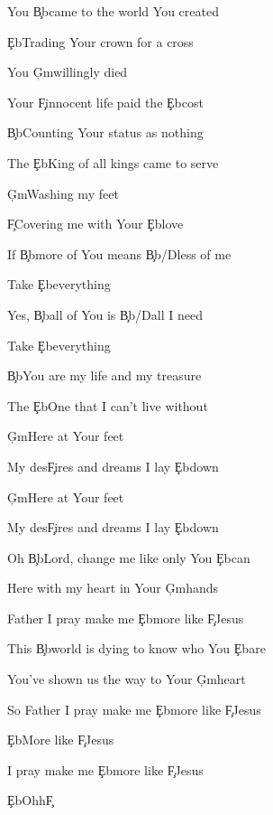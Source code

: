 \documentclass[9pt]{extarticle}
\begin{document}
\bsong

\bi

\ei

\bv
You \c{Bb}came to the world You created

\c{Eb}Trading Your crown for a cross

You \c{Gm}willingly died

Your \c{F}innocent life paid the \c{Eb}cost
\ev

\bv
\c{Bb}Counting Your status as nothing

The \c{Eb}King of all kings came to serve

\c{Gm}Washing my feet

\c{F}Covering me with Your \c{Eb}love
\ev

\bc
If \c{Bb}more of You means \c{Bb/D}less of me

Take \c{Eb}everything

Yes, \c{Bb}all of You is \c{Bb/D}all I need

Take \c{Eb}everything
\ec

\bv
\c{Bb}You are my life and my treasure

The \c{Eb}One that I can't live without

\c{Gm}Here at Your feet

My des\c{F}ires and dreams I lay \c{Eb}down

\c{Gm}Here at Your feet

My des\c{F}ires and dreams I lay \c{Eb}down
\ev


\bb[2]
Oh \c{Bb}Lord, change me like only You \c{Eb}can

Here with my heart in Your \c{Gm}hands

Father I pray make me \c{Eb}more like \c{F}Jesus

This \c{Bb}world is dying to know who You \c{Eb}are

You've shown us the way to Your \c{Gm}heart

So Father I pray make me \c{Eb}more like \c{F}Jesus
\eb

\bt
\c{Eb}More like \c{F}Jesus

I pray make me \c{Eb}more like \c{F}Jesus

\c{Eb}Ohh\c{F}
\et


\esong
\end{document}
